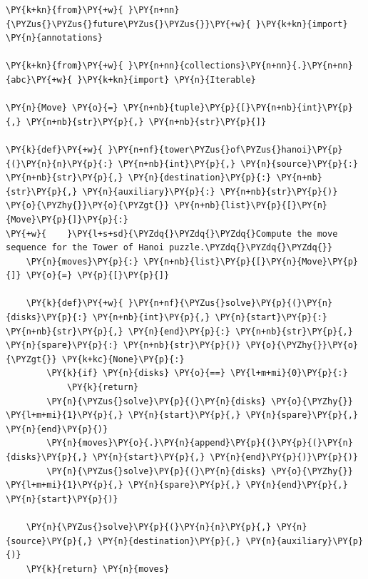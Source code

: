 \documentclass[a4paper,twoside]{article}
\begin{document}
\begin{tscode}[lang=python, engine=pygments]
\begin{Verbatim}[commandchars=\\\{\},breaklines, breakanywhere, commandchars=\\\{\}]
\PY{k+kn}{from}\PY{+w}{ }\PY{n+nn}{\PYZus{}\PYZus{}future\PYZus{}\PYZus{}}\PY{+w}{ }\PY{k+kn}{import} \PY{n}{annotations}

\PY{k+kn}{from}\PY{+w}{ }\PY{n+nn}{collections}\PY{n+nn}{.}\PY{n+nn}{abc}\PY{+w}{ }\PY{k+kn}{import} \PY{n}{Iterable}

\PY{n}{Move} \PY{o}{=} \PY{n+nb}{tuple}\PY{p}{[}\PY{n+nb}{int}\PY{p}{,} \PY{n+nb}{str}\PY{p}{,} \PY{n+nb}{str}\PY{p}{]}

\PY{k}{def}\PY{+w}{ }\PY{n+nf}{tower\PYZus{}of\PYZus{}hanoi}\PY{p}{(}\PY{n}{n}\PY{p}{:} \PY{n+nb}{int}\PY{p}{,} \PY{n}{source}\PY{p}{:} \PY{n+nb}{str}\PY{p}{,} \PY{n}{destination}\PY{p}{:} \PY{n+nb}{str}\PY{p}{,} \PY{n}{auxiliary}\PY{p}{:} \PY{n+nb}{str}\PY{p}{)} \PY{o}{\PYZhy{}}\PY{o}{\PYZgt{}} \PY{n+nb}{list}\PY{p}{[}\PY{n}{Move}\PY{p}{]}\PY{p}{:}
\PY{+w}{    }\PY{l+s+sd}{\PYZdq{}\PYZdq{}\PYZdq{}Compute the move sequence for the Tower of Hanoi puzzle.\PYZdq{}\PYZdq{}\PYZdq{}}
    \PY{n}{moves}\PY{p}{:} \PY{n+nb}{list}\PY{p}{[}\PY{n}{Move}\PY{p}{]} \PY{o}{=} \PY{p}{[}\PY{p}{]}

    \PY{k}{def}\PY{+w}{ }\PY{n+nf}{\PYZus{}solve}\PY{p}{(}\PY{n}{disks}\PY{p}{:} \PY{n+nb}{int}\PY{p}{,} \PY{n}{start}\PY{p}{:} \PY{n+nb}{str}\PY{p}{,} \PY{n}{end}\PY{p}{:} \PY{n+nb}{str}\PY{p}{,} \PY{n}{spare}\PY{p}{:} \PY{n+nb}{str}\PY{p}{)} \PY{o}{\PYZhy{}}\PY{o}{\PYZgt{}} \PY{k+kc}{None}\PY{p}{:}
        \PY{k}{if} \PY{n}{disks} \PY{o}{==} \PY{l+m+mi}{0}\PY{p}{:}
            \PY{k}{return}
        \PY{n}{\PYZus{}solve}\PY{p}{(}\PY{n}{disks} \PY{o}{\PYZhy{}} \PY{l+m+mi}{1}\PY{p}{,} \PY{n}{start}\PY{p}{,} \PY{n}{spare}\PY{p}{,} \PY{n}{end}\PY{p}{)}
        \PY{n}{moves}\PY{o}{.}\PY{n}{append}\PY{p}{(}\PY{p}{(}\PY{n}{disks}\PY{p}{,} \PY{n}{start}\PY{p}{,} \PY{n}{end}\PY{p}{)}\PY{p}{)}
        \PY{n}{\PYZus{}solve}\PY{p}{(}\PY{n}{disks} \PY{o}{\PYZhy{}} \PY{l+m+mi}{1}\PY{p}{,} \PY{n}{spare}\PY{p}{,} \PY{n}{end}\PY{p}{,} \PY{n}{start}\PY{p}{)}

    \PY{n}{\PYZus{}solve}\PY{p}{(}\PY{n}{n}\PY{p}{,} \PY{n}{source}\PY{p}{,} \PY{n}{destination}\PY{p}{,} \PY{n}{auxiliary}\PY{p}{)}
    \PY{k}{return} \PY{n}{moves}


\end{Verbatim}
\end{tscode}
\end{document}
